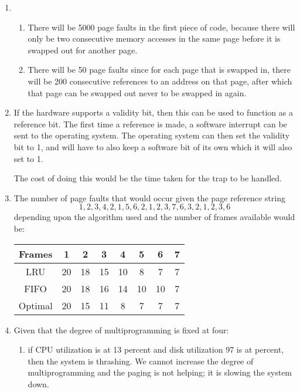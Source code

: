 \documentclass[fleqn]{article}
\newenvironment{answers}{ %
	\begin{enumerate}
		\setlength{\itemsep}{\bigskipamount}
}{	\end{enumerate}	}
\begin{document}
\begin{answers}
	\item %
	\begin{enumerate}
		\item %
		There will be 5000 page faults in the first piece of code, because there will only be two consecutive memory accesses in the same page before it is swapped out for another page.

		\item %
		There will be 50 page faults since for each page that is swapped in, there will be 200 consecutive references to an address on that page, after which that page can be swapped out never to be swapped in again.
	\end{enumerate}

	\item %
	If the hardware supports a validity bit, then this can be used to function as a reference bit. The first time a reference is made, a software interrupt can be sent to the operating system. The operating system can then set the validity bit to 1, and will have to also keep a software bit of its own which it will also set to 1.

	The cost of doing this would be the time taken for the trap to be handled.

	\item %
	The number of page faults that would occur given the page reference string
	\[1, 2, 3, 4, 2, 1, 5, 6, 2, 1, 2, 3, 7, 6, 3, 2, 1, 2, 3, 6\]
	depending upon the algorithm used and the number of frames available would be:
	\begin{table}[h]
		\centering
		\begin{tabular}{||c||c|c|c|c|c|c|c||}
			\hline
			Frames & 1 & 2 & 3 & 4 & 5 & 6 & 7 \\
			\hline
			LRU & 20 & 18 & 15 & 10 & 8 & 7 & 7 \\
			\hline
			FIFO & 20 & 18 & 16 & 14 & 10 & 10 & 7 \\
			\hline
			Optimal & 20 & 15 & 11 & 8 & 7 & 7 & 7 \\
			\hline
		\end{tabular}
	\end{table}

	\item %
	Given that the degree of multiprogramming is fixed at four:
	\begin{enumerate}
		\item %
		if CPU utilization is at 13 percent and disk utilization 97 is at percent, then the system is thrashing. We cannot increase the degree of multiprogramming and the paging is not helping; it is slowing the system down.


\end{enumerate}
\end{answers}
\end{document}
